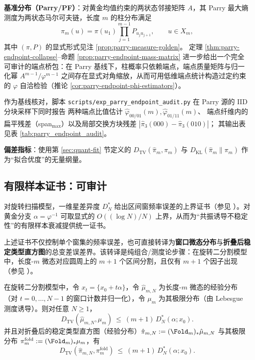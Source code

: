 \textbf{基准分布（Parry/PF）}：对黄金均值约束的两状态邻接矩阵 $A$，其 Parry 最大熵测度为两状态马尔可夫链，长度 $m$ 的柱分布满足
\[
\pi_m(u)=\pi(u_1)\prod_{j=1}^{m-1}P_{u_j u_{j+1}},\qquad u\in X_m,
\]
其中 $(\pi,P)$ 的显式形式见注 \ref{prop:parry-measure-golden}。
定理 \ref{thm:parry-endpoint-collapse}--命题 \ref{prop:parry-endpoint-mass-matrix} 进一步给出一个完全可审计的端点桥包：在 Parry 基线下，柱概率只依赖端点，端点质量矩阵与归一化幂 \(A^{m-1}/\varphi^{m-1}\) 之间存在显式对角缩放，从而可用低维端点统计构造过定约束的 \(\varphi\) 自洽检验（推论 \ref{cor:parry-endpoint-phi-estimators}）。

\begin{remark}\label{rem:parry-endpoint-audit}
作为基线核对，脚本 \texttt{scripts/exp\_parry\_endpoint\_audit.py} 在 Parry 源的 IID 分块采样下同时报告
两种端点比值估计 \(\widehat\varphi_{00/01}(m),\widehat\varphi_{01/11}(m)\)、
端点纤维内的扁平残差（span\(_{\max}\)）以及局部交换方块残差 \(|\hat\pi_3(000)-\hat\pi_3(010)|\)；
其输出表见表 \ref{tab:parry_endpoint_audit}。
\end{remark}


\textbf{偏差指标}：使用第 \ref{sec:quant-fit} 节定义的
\(
D_{\mathrm{TV}}(\hat{\pi}_m,\pi_m)
\)
与
\(
D_{\mathrm{KL}}(\hat{\pi}_m\|\pi_m)
\)
作为“拟合优度”的无量纲量。

\subsection{有限样本证书：可审计}

对旋转扫描模型，一维星差异度 $D_N^*$ 给出区间窗频率误差的上界证书（参见 \cite{KuipersNiederreiter1974}）。对黄金分支 $\alpha=\varphi^{-1}$ 可取显式的 $O((\log N)/N)$ 上界，从而为“共振诱导不稳定性”的有限样本衰减提供统一证书。

上述证书不仅控制单个窗集的频率误差，也可直接转译为\textbf{窗口微态分布}与\textbf{折叠后稳定类型直方图}的总变差误差界。该转译是纯组合/测度论步骤：在旋转二分割模型中，长度-$m$ 微态对应圆周上的 $m+1$ 个区间分割，且仅有 $m+1$ 个因子出现（参见 \cite{MorseHedlund1940,LindMarcus1995}）。

\begin{theorem}\label{thm:tv-certificate-hist}
在旋转二分割模型中，令 $x_t=\{x_0+t\alpha\}$，令 $\hat{\mu}_{m,N}$ 为长度-$m$ 微态的经验分布（对 $t=0,\dots,N-1$ 的窗口计数并归一化），令 $\mu_m$ 为其极限分布（由 Lebesgue 测度诱导）。则对任意 $N\ge 1$，
\[
D_{\mathrm{TV}}(\hat{\mu}_{m,N},\mu_m)\ \le\ (m+1)\,D_N^*(\alpha;x_0).
\]
并且对折叠后的稳定类型直方图（经验分布）$\hat{\pi}_{m,N}:=(\Fold_m)_*\hat{\mu}_{m,N}$ 与其极限分布 $\pi_m^{\mathrm{fold}}:=(\Fold_m)_*\mu_m$，有
\[
D_{\mathrm{TV}}(\hat{\pi}_{m,N},\pi_m^{\mathrm{fold}})\ \le\ (m+1)\,D_N^*(\alpha;x_0).
\]
\end{theorem}

